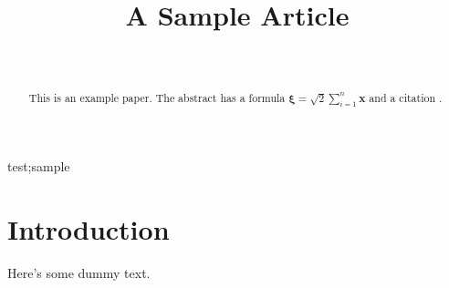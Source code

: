 \documentclass[wcp]{jmlr}
\author{\Name{Ann
Other}\Email{sample@nowhere.com}\\\addr{University of Nowhere}}
\title{A Sample Article}
\begin{document}
\maketitle

\begin{abstract}
This is an example paper. The abstract has a formula
$\boldsymbol{\xi} = \surd2 \sum_{i=1}^n \mathbf{x}$
and a citation \citep{smith2005}.
\end{abstract}
\begin{keywords}
test;sample
\end{keywords}

\section{Introduction}

Here's some dummy text.


\end{document}
